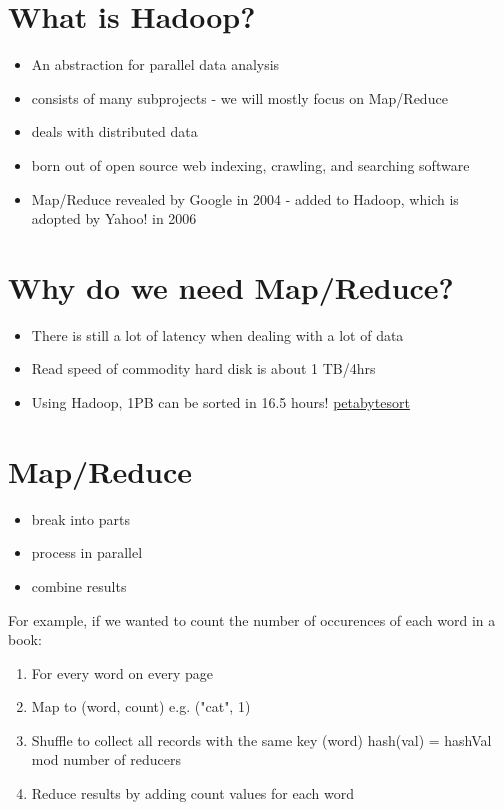 \section{What is Hadoop?}
\begin{itemize}
	\item An abstraction for parallel data analysis
	\item consists of many subprojects
		\subitem - we will mostly focus on Map/Reduce
	\item deals with distributed data
	\item born out of open source web indexing, crawling, and searching software
	\item Map/Reduce revealed by Google in 2004
		\subitem - added to Hadoop, which is adopted by Yahoo! in 2006
\end{itemize}

\section{Why do we need Map/Reduce?}
\begin{itemize}
	\item There is still a lot of latency when dealing with a lot of data
	\item Read speed of commodity hard disk is about 1 TB/4hrs
	\item Using Hadoop, 1PB can be sorted in 16.5 hours! \href{bit.ly/petabytesort}{petabytesort}
\end{itemize}

\section{Map/Reduce} 
\begin{itemize}
	\item break into parts
	\item process in parallel
	\item combine results
\end{itemize} 

For example, if we wanted to count the number of occurences of each word in a book:
\begin{enumerate} 
	\item For every word on every page
	\item Map to (word, count) e.g. ("cat", 1) 
	\item Shuffle to collect all records with the same key (word)
		\subitem hash(val) = hashVal mod number of reducers
	\item Reduce results by adding count values for each word 
\end{enumerate}

